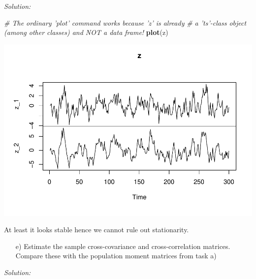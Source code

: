 \documentclass[12pt,a4paper]{article}
\newenvironment{Shaded}{\begin{snugshade}}{\end{snugshade}}
\newcommand{\CommentTok}[1]{\textcolor[rgb]{0.56,0.35,0.01}{\textit{#1}}}
\newcommand{\KeywordTok}[1]{\textcolor[rgb]{0.13,0.29,0.53}{\textbf{#1}}}
\newcommand{\NormalTok}[1]{#1}
\begin{document}
\emph{Solution:}\\

\begin{Shaded}
\begin{Highlighting}[]
\CommentTok{# The ordinary 'plot' command works because 'z' is already }
\CommentTok{# a 'ts'-class object (among other classes) and NOT a data frame!}
\KeywordTok{plot}\NormalTok{(z)}
\end{Highlighting}
\end{Shaded}

\includegraphics{exercise_2_files/figure-latex/unnamed-chunk-8-1.pdf}

At least it looks stable hence we cannot rule out stationarity.

\begin{itemize}
  \item[e)] Estimate the sample cross-covariance and cross-correlation matrices. Compare these with the population moment matrices from task a)
\end{itemize}

\emph{Solution:}
\end{document}

